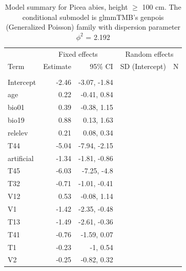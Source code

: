 \documentclass[
]{article}
\begin{document}
\begin{longtable}[t]{lrrrr}
\caption{\label{tab:summaries-tables}\label{tab:Pa2}Model summary for Picea abies, height $\geq$ 100 cm. The conditional submodel is glmmTMB's genpois (Generalized Poisson) family with dispersion parameter $\phi^{2}$ = 2.192}\\
\toprule
\multicolumn{1}{c}{ } & \multicolumn{2}{c}{Fixed effects} & \multicolumn{2}{c}{Random effects} \\
\cmidrule(l{3pt}r{3pt}){2-3} \cmidrule(l{3pt}r{3pt}){4-5}
Term & Estimate & 95\% CI & SD (Intercept) & N\\
\midrule
\addlinespace[0.3em]
\multicolumn{5}{l}{\textbf{Conditional model}}\\
\hspace{1em}Intercept & -2.46 & -3.07, -1.84 &  & \\
\hspace{1em}age & 0.22 & -0.41, 0.84 &  & \\
\hspace{1em}bio01 & 0.39 & -0.38, 1.15 &  & \\
\hspace{1em}bio19 & 0.88 & 0.13, 1.63 &  & \\
\hspace{1em}relelev & 0.21 & 0.08, 0.34 &  & \\
\hspace{1em}T44 & -5.04 & -7.94, -2.15 &  & \\
\hspace{1em}artificial & -1.34 & -1.81, -0.86 &  & \\
\hspace{1em}T45 & -6.03 & -7.25, -4.8 &  & \\
\hspace{1em}T32 & -0.71 & -1.01, -0.41 &  & \\
\hspace{1em}V12 & 0.53 & -0.08, 1.14 &  & \\
\hspace{1em}V1 & -1.42 & -2.35, -0.48 &  & \\
\hspace{1em}T13 & -1.49 & -2.61, -0.36 &  & \\
\hspace{1em}T41 & -0.76 & -1.59, 0.07 &  & \\
\hspace{1em}T1 & -0.23 & -1, 0.54 &  & \\
\hspace{1em}V2 & -0.25 & -0.82, 0.32 &  & \\

\end{longtable}
\end{document}

